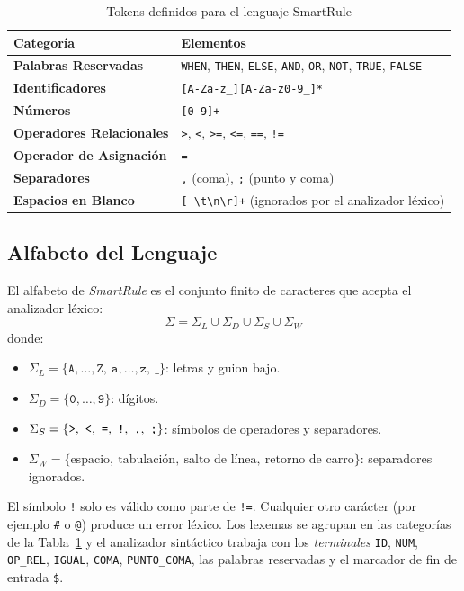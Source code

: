 \documentclass[12pt,a4paper]{article}
\begin{document}
\begin{table}[H]
\centering
\begin{tabular}{|l|l|}
\hline
\textbf{Categoría} & \textbf{Elementos} \\ 
\hline
\textbf{Palabras Reservadas} & \texttt{WHEN}, \texttt{THEN}, \texttt{ELSE}, \texttt{AND}, \texttt{OR}, \texttt{NOT}, \texttt{TRUE}, \texttt{FALSE} \\ 
\hline
\textbf{Identificadores} & \texttt{[A-Za-z\_][A-Za-z0-9\_]*} \\ 
\hline
\textbf{Números} & \texttt{[0-9]+} \\ 
\hline
\textbf{Operadores Relacionales} & \texttt{>}, \texttt{<}, \texttt{>=}, \texttt{<=}, \texttt{==}, \texttt{!=} \\ 
\hline
\textbf{Operador de Asignación} & \texttt{=} \\ 
\hline
\textbf{Separadores} & \texttt{,} (coma), \texttt{;} (punto y coma) \\ 
\hline
\textbf{Espacios en Blanco} & \texttt{[ \textbackslash t\textbackslash n\textbackslash r]+} (ignorados por el analizador léxico) \\ 
\hline
\end{tabular}
\caption{Tokens definidos para el lenguaje SmartRule}
\label{tab:tokens}
\end{table}

\subsection{Alfabeto del Lenguaje}
El alfabeto de \textit{SmartRule} es el conjunto finito de caracteres que acepta el analizador léxico:
\[
\Sigma = \Sigma_{L} \cup \Sigma_{D} \cup \Sigma_{S} \cup \Sigma_{W}
\]
donde:
\begin{itemize}[leftmargin=1cm]
    \item $\Sigma_{L} = \{\texttt{A},\dots,\texttt{Z},\ \texttt{a},\dots,\texttt{z},\ \texttt{\_}\}$: letras y guion bajo.
    \item $\Sigma_{D} = \{\texttt{0},\dots,\texttt{9}\}$: dígitos.
    \item $\Sigma_{S} = \{\texttt{\textgreater},\ \texttt{\textless},\ \texttt{=},\ \texttt{!},\ \texttt{,},\ \texttt{;}\}$: símbolos de operadores y separadores.
    \item $\Sigma_{W} = \{\text{espacio},\ \text{tabulación},\ \text{salto de línea},\ \text{retorno de carro}\}$: separadores ignorados.
\end{itemize}
El símbolo \texttt{!} solo es válido como parte de \texttt{!=}. Cualquier otro carácter (por ejemplo \texttt{\#} o \texttt{@}) produce un error léxico. Los lexemas se agrupan en las categorías de la Tabla~\ref{tab:tokens} y el analizador sintáctico trabaja con los \textit{terminales} \texttt{ID}, \texttt{NUM}, \texttt{OP\_REL}, \texttt{IGUAL}, \texttt{COMA}, \texttt{PUNTO\_COMA}, las palabras reservadas y el marcador de fin de entrada \texttt{\$}.
\end{document}
